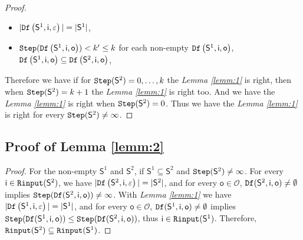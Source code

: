 \begin{appendices}
\begin{proof}
\begin{itemize}
 \item  $|{\tt Df}\left(\mathsf{S}^{1},\mathsf{i},\varepsilon\right)|=|\mathsf{S}^1|$,
 \item  ${\tt Step}({\tt Df}\left(\mathsf{S}^{1},\mathsf{i},\mathsf{o}\right))<k'\le k$ for each non-empty ${\tt Df}\left(\mathsf{S}^{1},\mathsf{i},\mathsf{o}\right)$, ${\tt Df}\left(\mathsf{S}^{1},\mathsf{i},\mathsf{o}\right)\subseteq {\tt Df}\left(\mathsf{S}^{2},\mathsf{i},\mathsf{o}\right)$,
 \end{itemize} 
 Therefore we have if for ${\tt Step}(\mathsf{S}^{2})=0,\ldots, k$ the {\em Lemma \ref{lemm:1}} is right, then when ${\tt Step}(\mathsf{S}^{2})=k+1$ the {\em Lemma \ref{lemm:1}} is right too. 
And we have the {\em Lemma \ref{lemm:1}} is right when ${\tt Step}(\mathsf{S}^{2})=0$. Thus we have the {\em Lemma \ref{lemm:1}} is right for every ${\tt Step}(\mathsf{S}^{2})\ne \infty$.
 
\end{proof}
\subsection{Proof of Lemma \ref{lemm:2}}
\begin{proof}
For the non-empty $\mathsf{S}^{1}$ and $\mathsf{S}^{2}$, if $\mathsf{S}^{1}\subseteq\mathsf{S}^{2}$ and ${\tt Step}(\mathsf{S}^{2})\ne\infty$.
For every $\mathsf{i}\in {\tt Rinput}(\mathsf{S}^2)$, we have  $|{\tt Df}\left(\mathsf{S}^2,\mathsf{i},\varepsilon\right)|=|\mathsf{S}^2|$, and 
for every $\mathsf{o} \in \mathcal{O}$, ${\tt Df}(\mathsf{S}^2,\mathsf{i},\mathsf{o})\ne \emptyset$ implies ${\tt Step}({\tt Df}(\mathsf{S}^2,\mathsf{i},\mathsf{o}))\ne \infty$. With {\em Lemma \ref{lemm:1}} we have $|{\tt Df}\left(\mathsf{S}^1,\mathsf{i},\varepsilon\right)|=|\mathsf{S}^1|$, and 
for every $\mathsf{o} \in \mathcal{O}$, ${\tt Df}(\mathsf{S}^1,\mathsf{i},\mathsf{o})\ne \emptyset$ implies ${\tt Step}({\tt Df}(\mathsf{S}^1,\mathsf{i},\mathsf{o}))\le {\tt Step}({\tt Df}(\mathsf{S}^2,\mathsf{i},\mathsf{o}))$, thus $\mathsf{i}\in {\tt Rinput}(\mathsf{S}^1)$. Therefore, ${\tt Rinput}(\mathsf{S}^2)\subseteq{\tt Rinput}(\mathsf{S}^1)$.
\end{proof}



\end{appendices}

